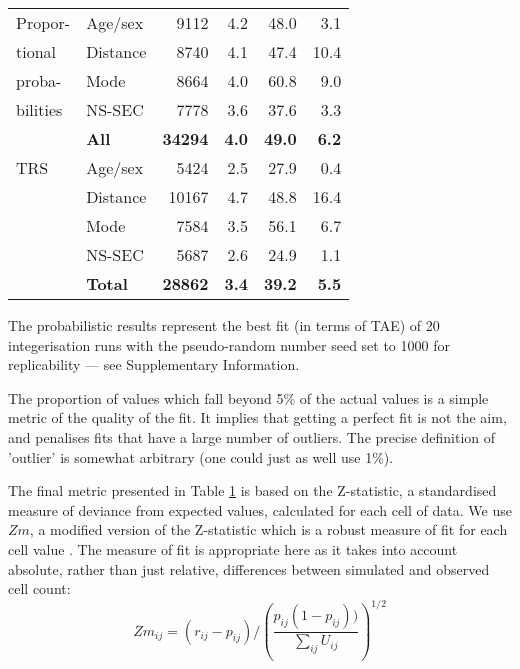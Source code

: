 \begin{table}[]
{\begin{center}
\begin{tabular}{llrrrr}
Propor- & Age/sex & 9112 & 4.2 & 48.0 & 3.1 \\
tional & Distance & 8740 & 4.1 & 47.4 & 10.4 \\
proba- & Mode & 8664 & 4.0 & 60.8 & 9.0 \\
bilities & NS-SEC & 7778 & 3.6 & 37.6 & 3.3 \\
 & \textbf{All} & \textbf{34294} & \textbf{4.0} & \textbf{49.0} & \textbf{6.2}
\\
\midrule
TRS &Age/sex & 5424 & 2.5 & 27.9 & 0.4 \\
 & Distance & 10167 & 4.7 & 48.8 & 16.4 \\
 & Mode & 7584 & 3.5 & 56.1 & 6.7 \\
 & NS-SEC & 5687 & 2.6 & 24.9 & 1.1 \\
 & \textbf{Total} & \textbf{28862} & \textbf{3.4} & \textbf{39.2} & \textbf{5.5}
\\
\bottomrule
\end{tabular}
\end{center}
}
\label{acc-results}
\begin{tablenotes}
      \footnotesize
      \item * The probabilistic
results represent the best fit (in terms of TAE) of 20 integerisation runs
with the pseudo-random number seed set to 1000 for replicability --- see
Supplementary Information.
    \end{tablenotes}
\end{table}

The proportion of values which fall beyond 5\% of the actual values is a simple
metric of the quality of the fit. It implies that getting a perfect fit is not
the aim, and penalises fits that have a large number of outliers. The precise
definition of 'outlier' is somewhat arbitrary (one could just as well use 1\%).

The final metric presented in Table \ref{acc-results}
is based on the Z-statistic, a standardised measure of
deviance from expected values, calculated for each cell of data. We use $Zm$, a
modified version of the Z-statistic which is a robust measure of fit for each
cell value \citet{Williamson1998}. The measure of
fit is appropriate here as it takes into account absolute, rather than just
relative, differences between simulated and observed cell count:
\begin{equation}
 Zm_{ij} = (r_{ij} - p_{ij}) \Bigg/ \left(\frac{p_{ij}(1 -
p_{ij}))}{\sum\limits_{ij}U_{ij}}\right)^{1/2}
\end{equation}

